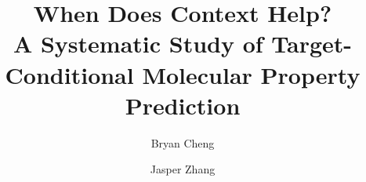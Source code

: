 \documentclass[sigconf]{acmart}
\begin{document}
\title[When Does Context Help? Target-Conditional Molecular Property Prediction]{When Does Context Help?\\
A Systematic Study of Target-Conditional Molecular Property Prediction}

\author{Bryan Cheng}

\author{Jasper Zhang}
\authornotemark[1]

\renewcommand{\shortauthors}{Cheng and Zhang}

\begin{abstract}

\end{abstract}
\end{document}
